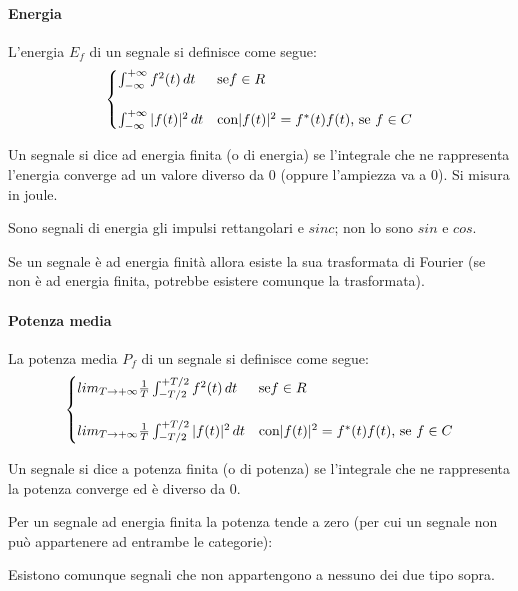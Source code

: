 \documentclass[a4paper, 10pt]{report}
\begin{document}
\paragraph*{Energia} L'energia $E_f$ di un segnale si definisce come segue:
\begin{align*}
\begin{cases} 
\int_{-\infty}^{+\infty} f^2(t)\, dt & $se$ f \in R \\\\
\int_{-\infty}^{+\infty} |f(t)|^2\, dt & $con$ |f(t)|^2 = f^*(t)f(t)$,  se $f \in C
\end{cases} 
\end{align*}

\noindent Un segnale si dice ad energia finita (o di energia)  se l'integrale che ne rappresenta l'energia converge ad un valore diverso da 0 (oppure l'ampiezza va a 0). Si misura in joule.

Sono segnali di energia gli impulsi rettangolari e $sinc$; non lo sono $sin$ e $cos$.

Se un segnale è ad energia finità allora esiste la sua trasformata di Fourier (se non è ad energia finita, potrebbe esistere comunque la trasformata).

\paragraph*{Potenza media} La potenza media $P_f$ di un segnale si definisce come segue:
\begin{align*}
\begin{cases} 
lim_{T \to +\infty} \frac{1}{T} \int_{-T/2}^{+T/2} f^2(t)\, dt & $se$ f \in R \\\\
lim_{T \to +\infty} \frac{1}{T} \int_{-T/2}^{+T/2} |f(t)|^2\, dt & $con$ |f(t)|^2 = f^*(t)f(t)$,  se $f \in C
\end{cases} 
\end{align*}

\noindent Un segnale si dice a potenza finita (o di potenza) se l’integrale che
ne rappresenta la potenza converge ed è diverso da 0.

Per un segnale ad energia finita la potenza tende a zero (per cui un
segnale non può appartenere ad entrambe le categorie):

Esistono comunque segnali che non appartengono a nessuno dei due tipo sopra.
\end{document}
